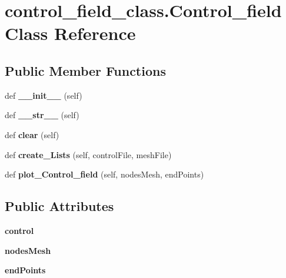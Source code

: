 \hypertarget{classcontrol__field__class_1_1Control__field}{}\section{control\+\_\+field\+\_\+class.\+Control\+\_\+field Class Reference}
\label{classcontrol__field__class_1_1Control__field}
\subsection*{Public Member Functions}
\begin{DoxyCompactItemize}
\item 
\mbox{\label{classcontrol__field__class_1_1Control__field_a59ad1cb5ff94be1b0e5b23f214f2d3a2}} 
def {\bfseries \+\_\+\+\_\+init\+\_\+\+\_\+} (self)
\item 
\mbox{\label{classcontrol__field__class_1_1Control__field_a3b7bead0fbb7cd8881bb36a3ef6c29be}} 
def {\bfseries \+\_\+\+\_\+str\+\_\+\+\_\+} (self)
\item 
\mbox{\label{classcontrol__field__class_1_1Control__field_ae5a07f08af2adbdf1cf82db71ce17e60}} 
def {\bfseries clear} (self)
\item 
\mbox{\label{classcontrol__field__class_1_1Control__field_a36121dd607d09ddfe0938e7ca3a6cbd7}} 
def {\bfseries create\+\_\+\+Lists} (self, control\+File, mesh\+File)
\item 
\mbox{\label{classcontrol__field__class_1_1Control__field_ae08df884b07fa3a8b1a3f905f8e29aad}} 
def {\bfseries plot\+\_\+\+Control\+\_\+field} (self, nodes\+Mesh, end\+Points)
\end{DoxyCompactItemize}
\subsection*{Public Attributes}
\begin{DoxyCompactItemize}
\item 
\mbox{\label{classcontrol__field__class_1_1Control__field_a7a31b55319ec88172570645f2d2ed02a}} 
{\bfseries control}
\item 
\mbox{\label{classcontrol__field__class_1_1Control__field_a924a36a6f239167d5d7f2d0135bc31cd}} 
{\bfseries nodes\+Mesh}
\item 
\mbox{\label{classcontrol__field__class_1_1Control__field_ac29bdb16856ca999ed47fabf46212a61}} 
{\bfseries end\+Points}
\end{DoxyCompactItemize}


